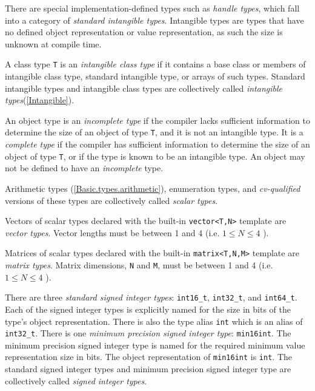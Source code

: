 \p There are special implementation-defined types such as \textit{handle types},
which fall into a category of \textit{standard intangible types}. Intangible
types are types that have no defined object representation or value
representation, as such the size is unknown at compile time.

\p A class type \texttt{T} is an \textit{intangible class type} if it contains
a base class or members of intangible class type, standard intangible type,
or arrays of such types. Standard intangible types and intangible class types
are collectively called \textit{intangible types}(\ref{Intangible}).

\p An object type is an \textit{incomplete type} if the compiler lacks
sufficient information to determine the size of an object of type \texttt{T},
and it is not an intangible type. It is a \textit{complete type} if the compiler
has sufficient information to determine the size of an object of type
\texttt{T}, or if the type is known to be an intangible type. An object may not
be defined to have an \textit{incomplete} type.

\p Arithmetic types (\ref{Basic.types.arithmetic}), enumeration types, and
\textit{cv-qualified} versions of these types are collectively called
\textit{scalar types}.

\p Vectors of scalar types declared with the built-in \texttt{vector<T,N>}
template are \textit{vector types}. Vector lengths must be between 1 and 4 (i.e.
\( 1 \leq N \leq 4 \) ).

\p Matrices of scalar types declared with the built-in \texttt{matrix<T,N,M>}
template are \textit{matrix types}. Matrix dimensions, \texttt{N} and
\texttt{M}, must be between 1 and 4 (i.e. \( 1 \leq N \leq 4 \) ).


\p There are three \textit{standard signed integer types}: \texttt{int16\_t},
\texttt{int32\_t}, and \texttt{int64\_t}. Each of the signed integer types is
explicitly named for the size in bits of the type's object representation. There
is also the type alias \texttt{int} which is an alias of \texttt{int32\_t}.
There is one \textit{minimum precision signed integer type}: \texttt{min16int}.
The minimum precision signed integer type is named for the required minimum
value representation size in bits. The object representation of
\texttt{min16int} is \texttt{int}. The standard signed integer types and minimum
precision signed integer type are collectively called \textit{signed integer
types}.


